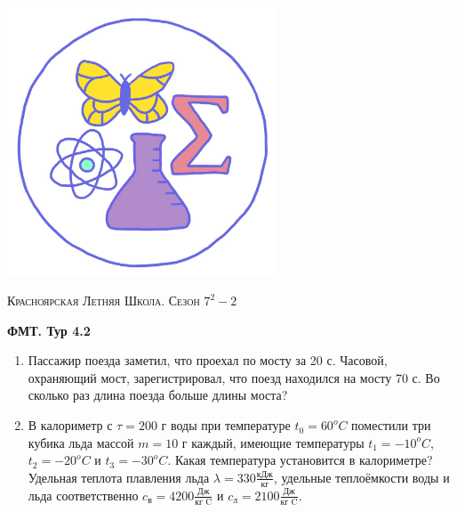 \colorbox{white!10!}{
    \begin{minipage}{0.2\textwidth}
       \begin{flushleft}
        \includegraphics[width = 0.6\textwidth]{Эмблема.png}
       \end{flushleft}
    \end{minipage}
    \begin{minipage}[t]{0.7 \textwidth}
        \begin{center}
            {\huge \textsc{Красноярская Летняя Школа. Сезон $7^2 - 2$}}
            \vspace{0.25cm}
            
            { \huge \textbf{ФМТ. Тур 4.2}}
        \end{center}
        \vspace{0.05cm}
    \end{minipage}
}

\begin{enumerate}
    \item Пассажир поезда заметил, что проехал по мосту за 20 с. Часовой, охраняющий мост, зарегистрировал, что поезд находился на мосту 70 с. Во сколько раз длина поезда больше длины моста?
	\item В калориметр с $\tau = 200$ г воды при температуре $t_0 = 60^{o}C$  поместили три кубика льда массой $m = 10$ г каждый, имеющие температуры $t_1 = -10^{o}C$, $t_2 = -20^{o} C$ и $t_3 = -30^{o} C$. Какая температура установится в калориметре? Удельная теплота плавления льда $\lambda = 330 \frac{\text{кДж}}{\text{кг}}$, удельные теплоёмкости воды и льда соответственно $c_{\text{в}} = 4200 \frac{\text{Дж}}{\text{кг\ C}}$ и $c_{\text{л}} = 2100 \frac{\text{Дж}}{\text{кг\ C}}$.  

\end{enumerate}